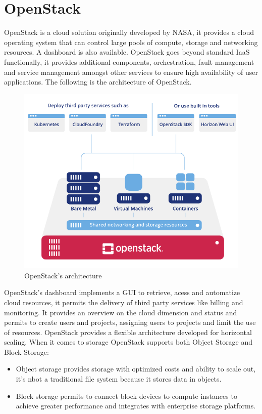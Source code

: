 \section{OpenStack}
OpenStack is a cloud solution originally developed by NASA, it provides a cloud operating system that can control large pools of compute, storage and networking resources. A dashboard is also available. \n
OpenStack goes beyond standard IaaS functionally, it provides additional components, orchestration, fault management and service management amongst other services to ensure high availability of user applications. The following is the architecture of OpenStack.
\begin{figure}
    \centering
    \includegraphics[scale=0.6]{Images/OpenStack.png}
    \caption{OpenStack's architecture}
\end{figure}
OpenStack's dashboard implements a GUI to retrieve, acess and automatize cloud resources, it permits the delivery of third party services like billing and monitoring. It provides an overview on the cloud dimension and status and permits to create users and projects, assigning users to projects and limit the use of resources. OpenStack provides a flexible architecture developed for horizontal scaling. \n
When it comes to storage OpenStack supports both Object Storage and Block Storage:
\begin{itemize}
    \item Object storage provides storage with optimized costs and ability to scale out, it's nbot a traditional file system because it stores data in objects.
    \item Block storage permits to connect block devices to compute instances to achieve greater performance and integrates with enterprise storage platforms.
\end{itemize}
